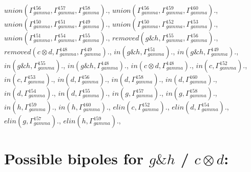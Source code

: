 \documentclass[a4paper, 11pt]{article}
\begin{document}
$union(\Gamma_{gamma}^{156}, \Gamma_{gamma}^{157}, \Gamma_{gamma}^{158}).$, $union(\Gamma_{gamma}^{156}, \Gamma_{gamma}^{159}, \Gamma_{gamma}^{160}).$, $union(\Gamma_{gamma}^{150}, \Gamma_{gamma}^{151}, \Gamma_{gamma}^{149}).$, $union(\Gamma_{gamma}^{150}, \Gamma_{gamma}^{152}, \Gamma_{gamma}^{153}).$, $union(\Gamma_{gamma}^{151}, \Gamma_{gamma}^{154}, \Gamma_{gamma}^{155}).$, $removed(g \binampersand h, \Gamma_{gamma}^{155}, \Gamma_{gamma}^{156}).$, $removed(c \otimes d, \Gamma_{gamma}^{148}, \Gamma_{gamma}^{149}).$, $in(g \binampersand h, \Gamma_{gamma}^{151}).$, $in(g \binampersand h, \Gamma_{gamma}^{149}).$, $in(g \binampersand h, \Gamma_{gamma}^{155}).$, $in(g \binampersand h, \Gamma_{gamma}^{148}).$, $in(c \otimes d, \Gamma_{gamma}^{148}).$, $in(c, \Gamma_{gamma}^{152}).$, $in(c, \Gamma_{gamma}^{153}).$, $in(d, \Gamma_{gamma}^{156}).$, $in(d, \Gamma_{gamma}^{158}).$, $in(d, \Gamma_{gamma}^{160}).$, $in(d, \Gamma_{gamma}^{154}).$, $in(d, \Gamma_{gamma}^{155}).$, $in(g, \Gamma_{gamma}^{157}).$, $in(g, \Gamma_{gamma}^{158}).$, $in(h, \Gamma_{gamma}^{159}).$, $in(h, \Gamma_{gamma}^{160}).$, $elin(c, \Gamma_{gamma}^{152}).$, $elin(d, \Gamma_{gamma}^{154}).$, $elin(g, \Gamma_{gamma}^{157}).$, $elin(h, \Gamma_{gamma}^{159}).$, 
\section{Possible bipoles for $g \binampersand h$ / $c \otimes d$:} 
\end{document}
